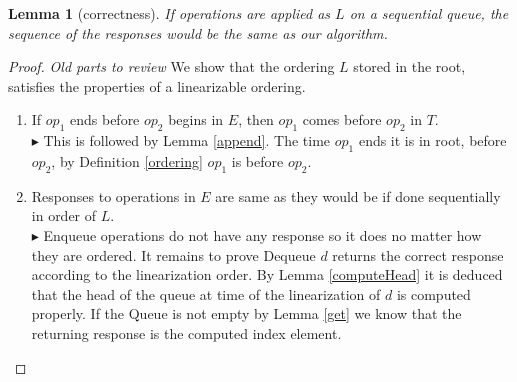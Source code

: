 \documentclass[10pt]{article}
\renewcommand{\it}[1]{\textit{#1}}
\newtheorem{lemma}[theorem]{Lemma}
\theoremstyle{definition}
\begin{document}
\begin{lemma}[correctness]
  If operations are applied as $L$ on a sequential queue, the sequence of the responses would be the same as our algorithm.
\end{lemma}

\begin{proof}
\it{Old parts to review}
  We show that the ordering $L$ stored in the root, satisfies the properties of a linearizable ordering.
  \begin{enumerate}
    \item If $op_1$ ends before $op_2$ begins in $E$, then $op_1$ comes before $op_2$ in $T$.\\$\blacktriangleright$ This is followed by Lemma \ref{append}. The time $op_1$ ends it is in root, before $op_2$, by Definition \ref{ordering} $op_1$ is before $op_2$.
    \item Responses to operations in $E$ are same as they would be if done sequentially in order of $L$. \\$\blacktriangleright$ Enqueue operations do not have any response so it does no matter how they are ordered. It remains to prove  Dequeue $d$ returns the correct response according to the linearization order. By Lemma \ref{computeHead} it is deduced that the head of the queue at time of the linearization of $d$ is computed properly. If the Queue is not empty by Lemma \ref{get} we know that the returning response is the computed index element.
  \end{enumerate} 
\end{proof}

\pagebreak
\end{document}
